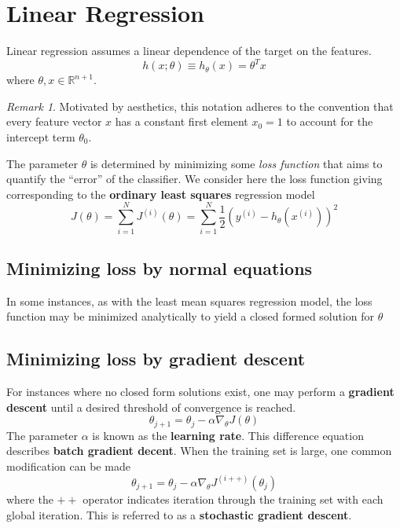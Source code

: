 \documentclass{article}
\theoremstyle{definition}
\theoremstyle{remark}
\newtheorem*{remark}{Remark}
\begin{document}
\section{Linear Regression}
Linear regression assumes a linear dependence of the target on the features. 
\begin{equation}
    \label{eqn:linearregression}
    h(x;\theta) \equiv h_{\theta}(x) = \theta^{T}x 
\end{equation}
where $\theta, x \in \mathbb{R}^{n+1}$.
\begin{remark}
Motivated by aesthetics, this notation adheres to the convention that every feature vector $x$ has a constant first element $x_{0}=1$ to account for the intercept term $\theta_{0}$.
\end{remark}
The parameter $\theta$ is determined by minimizing some \textit{loss function} that aims to quantify the ``error'' of the classifier.
We consider here the loss function giving corresponding to the \textbf{ordinary least squares} regression model
\begin{equation}
    \label{eqn:lossfunction}
    J(\theta) = \sum_{i=1}^{N}J^{(i)}(\theta) =  \sum_{i=1}^{N}\frac{1}{2}{\left(y^{(i)} - h_{\theta}(x^{(i)})\right)}^{2}
\end{equation}
\subsection{Minimizing loss by normal equations}
In some instances, as with the least mean squares regression model, the loss function may be minimized analytically to yield a closed formed solution for $\theta$


\subsection{Minimizing loss by gradient descent}
For instances where no closed form solutions exist, one may perform a \textbf{gradient descent} until a desired threshold of convergence is reached.
\begin{equation}
    \theta_{j+1} = \theta_{j} - \alpha \nabla_{\theta}J(\theta)
\end{equation}
The parameter $\alpha$ is known as the \textbf{learning rate}.
This difference equation describes \textbf{batch gradient decent}.
When the training set is large, one common modification can be made
\begin{equation}
    \theta_{j+1} = \theta_{j} - \alpha \nabla_{\theta} J^{(i++)}(\theta_{j})
\end{equation}
where the $++$ operator indicates iteration through the training set with each global iteration. This is referred to as a \textbf{stochastic gradient descent}.
\end{document}

